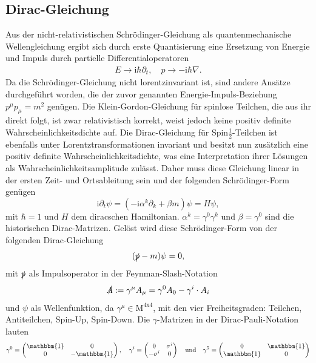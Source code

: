 \documentclass[11pt,a4paper,twoside]{report}
\begin{document}
\subsection{Dirac-Gleichung}
Aus der nicht-relativistischen Schrödinger-Gleichung als quantenmechanische Wellengleichung ergibt sich durch erste Quantisierung \cite{TeilFortgeschr} eine Ersetzung von Energie 
und Impuls durch partielle Differentialoperatoren
\begin{align*}
 E \rightarrow \text{i}\hbar\partial_t, \quad p \rightarrow -\text{i}\hbar\nabla.
\end{align*}
Da die Schrödinger-Gleichung nicht lorentzinvariant ist, sind andere Ansätze durchgeführt worden, die der zuvor genannten Energie-Impuls-Beziehung $p^\mu p_\mu = m^2$
genügen. Die Klein-Gordon-Gleichung für spinlose Teilchen, die aus ihr direkt folgt, ist zwar relativistisch korrekt, weist jedoch keine positiv definite 
Wahrscheinlichkeitsdichte auf. Die Dirac-Gleichung für Spin$\frac12$-Teilchen ist ebenfalls unter Lorentztransformationen invariant und besitzt nun
zusätzlich eine positiv definite Wahrscheinlichkeitsdichte, was eine Interpretation ihrer Lösungen als Wahrscheinlichkeitsamplitude zulässt. Daher muss diese
Gleichung linear in der ersten Zeit- und Ortsableitung sein und der folgenden Schrödinger-Form genügen \cite{RelQuantMech}
\begin{equation}
 \text{i} \partial_t \psi = \left(-\text{i}\alpha^k\partial_k + \beta m\right)\psi = H \psi,
 \label{eq_diracSchroedinger}
\end{equation}
mit $\hbar = 1$ und $H$ dem diracschen Hamiltonian. $\alpha^k = \gamma^0\gamma^k$ und $\beta = \gamma^0$ sind die historischen Dirac-Matrizen. Gelöst wird
diese Schrödinger-Form von der folgenden Dirac-Gleichung
\begin{equation}
 (\slashed{p} - m )\psi = 0,
 \label{eq_dirac}
\end{equation}
mit $\slashed{p}$ als Impulsoperator in der Feynman-Slash-Notation
\begin{equation}
 \slashed{A} := \gamma^\mu A_\mu = \gamma^0 A_0 - \gamma^i\cdot A_i
\end{equation}
und $\psi$ als Wellenfunktion, da $\gamma^\mu \in \text{M}^{4\text{x}4}$, mit den vier Freiheitsgraden: Teilchen, Antiteilchen, Spin-Up, Spin-Down.
Die $\gamma$-Matrizen in der Dirac-Pauli-Notation lauten
\begin{equation*}
  \gamma^0 = \begin{pmatrix} 
              \mathbbm{1} & 0 \\
              0 & -\mathbbm{1}
             \end{pmatrix},\quad \gamma^i = \begin{pmatrix}
					0 & \sigma^i\\
					-\sigma^i & 0
				      \end{pmatrix} \quad \text{und}\quad \gamma^5 = \begin{pmatrix}
									  0 & \mathbbm{1}\\
									  \mathbbm{1} & 0
									   \end{pmatrix}
\end{equation*}
\end{document}
